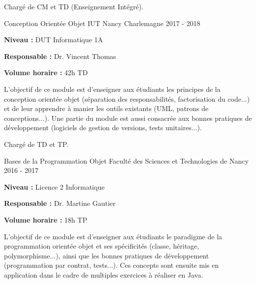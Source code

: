 \documentclass[12pt, a4paper]{awesome-cv}
\begin{document}
\begin{cventries}
  \begin{cvparagraph}
    Chargé de CM et TD (Enseignement Intégré).
  \end{cvparagraph}

  \cventry
  {Conception Orientée Objet} %
  {IUT Nancy Charlemagne} %
  {} %
  {2017 - 2018} %
  {
    \begin{cvitems}
      \item {\textbf{Niveau : } DUT Informatique 1A}
      \item {\textbf{Responsable : } Dr. Vincent Thomas}
      \item {\textbf{Volume horaire : } 42h TD}
    \end{cvitems}
  }

  \begin{cvparagraph}
    L'objectif de ce module est d'enseigner aux étudiants les principes de la conception orientée objet (séparation des responsabilités, factorisation du code...) et de leur apprendre à manier les outils existants (UML, patrons de conceptions...).
    Une partie du module est aussi consacrée aux bonnes pratiques de développement (logiciels de gestion de versions, tests unitaires...).
  \end{cvparagraph}

  \begin{cvparagraph}
    Chargé de TD et TP.
  \end{cvparagraph}

  \cventry
  {Bases de la Programmation Objet} %
  {Faculté des Sciences et Technologies de Nancy} %
  {} %
  {2016 - 2017} %
  {
    \begin{cvitems}
      \item {\textbf{Niveau : } Licence 2 Informatique}
      \item {\textbf{Responsable : } Dr. Martine Gautier}
      \item {\textbf{Volume horaire : } 18h TP}
    \end{cvitems}
  }

  \begin{cvparagraph}
    L'objectif de ce module est d'enseigner aux étudiants le paradigme de la programmation orientée objet et ses spécificités (classe, héritage, polymorphisme...), ainsi que les bonnes pratiques de développement (programmation par contrat, tests...).
    Ces concepts sont ensuite mis en application dans le cadre de multiples exercices à réaliser en Java.
  \end{cvparagraph}


\end{cventries}
\end{document}
